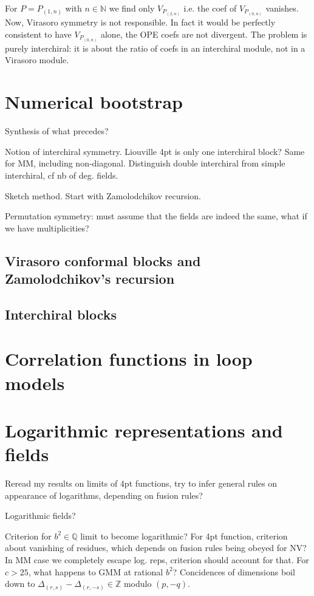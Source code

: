 \documentclass[12pt, a4paper]{article}
\theoremstyle{break}
\begin{document}
For $P=P_{(1,n)}$ with $n\in\mathbb{N}$ we find only $V_{P_{(2,n)}}$ i.e. the coef of $V_{P_{(0,n)}}$ vanishes. Now, Virasoro symmetry is not responsible. In fact it would be perfectly consistent to have $V_{P_{(0,n)}}$ alone, the OPE coefs are not divergent. The problem is purely interchiral: it is about the ratio of coefs in an interchiral module, not in a Virasoro module. 

\section{Numerical bootstrap}

Synthesis of what precedes?

Notion of interchiral symmetry. Liouville 4pt is only one interchiral block? Same for MM, including non-diagonal. Distinguish double interchiral from simple interchiral, cf nb of deg. fields. 

Sketch method. Start with Zamolodchikov recursion.

Permutation symmetry: must assume that the fields are indeed the same, what if we have multiplicities? 

\subsection{Virasoro conformal blocks and Zamolodchikov's recursion}

\subsection{Interchiral blocks} \label{sec:icb}

\section{Correlation functions in loop models} \label{sec:cloop}

\section{Logarithmic representations and fields} \label{sec:log}

Reread my results on limits of 4pt functions, try to infer general rules on appearance of logarithms, depending on fusion rules?

Logarithmic fields?

Criterion for $b^2\in\mathbb{Q}$ limit to become logarithmic? For 4pt function, criterion about vanishing of residues, which depends on fusion rules being obeyed for NV? In MM case we completely escape log. reps, criterion should account for that.  
For $c>25$, what happens to GMM at rational $b^2$? Concidences of dimensions boil down to $\Delta_{(r,s)}-\Delta_{(r,-s)} \in \mathbb{Z}$ modulo $(p, -q)$. 
\end{document}
